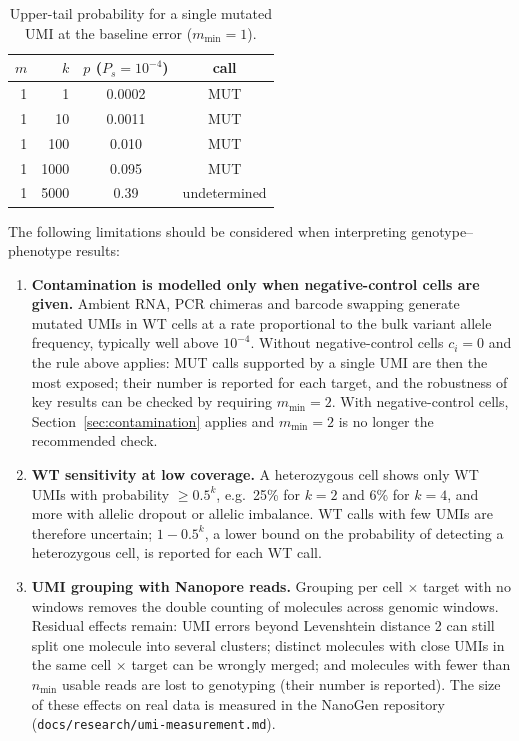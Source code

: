 \documentclass[11pt]{article}
\begin{document}
\begin{table}[h]
\centering
\begin{tabular}{rrcc}
\toprule
$m$ & $k$ & $p$ ($P_s=10^{-4}$) & call \\
\midrule
1 & 1    & 0.0002 & MUT \\
1 & 10   & 0.0011 & MUT \\
1 & 100  & 0.010  & MUT \\
1 & 1000 & 0.095  & MUT \\
1 & 5000 & 0.39   & undetermined \\
\bottomrule
\end{tabular}
\caption{Upper-tail probability for a single mutated UMI at the baseline error ($m_{\min}=1$).}
\label{tab:p}
\end{table}

The following limitations should be considered when interpreting genotype--phenotype results:
\begin{enumerate}
\item \textbf{Contamination is modelled only when negative-control cells are given.} Ambient RNA, PCR chimeras and barcode swapping generate mutated UMIs in WT cells at a rate proportional to the bulk variant allele frequency, typically well above $10^{-4}$. Without negative-control cells $c_i=0$ and the rule above applies: MUT calls supported by a single UMI are then the most exposed; their number is reported for each target, and the robustness of key results can be checked by requiring $m_{\min}=2$. With negative-control cells, Section~\ref{sec:contamination} applies and $m_{\min}=2$ is no longer the recommended check.
\item \textbf{WT sensitivity at low coverage.} A heterozygous cell shows only WT UMIs with probability $\geq 0.5^{k}$, e.g.\ 25\% for $k=2$ and 6\% for $k=4$, and more with allelic dropout or allelic imbalance. WT calls with few UMIs are therefore uncertain; $1-0.5^{k}$, a lower bound on the probability of detecting a heterozygous cell, is reported for each WT call.
\item \textbf{UMI grouping with Nanopore reads.} Grouping per cell $\times$ target with no windows removes the double counting of molecules across genomic windows. Residual effects remain: UMI errors beyond Levenshtein distance 2 can still split one molecule into several clusters; distinct molecules with close UMIs in the same cell $\times$ target can be wrongly merged; and molecules with fewer than $n_{\min}$ usable reads are lost to genotyping (their number is reported). The size of these effects on real data is measured in the NanoGen repository (\texttt{docs/research/umi-measurement.md}).
\end{enumerate}
\end{document}
